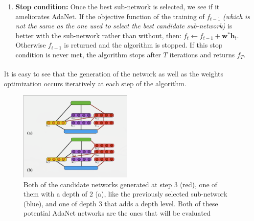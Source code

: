 \documentclass[11 pt]{article}
\begin{document}
\begin{enumerate}
	\item \textbf{Stop condition: }Once the best sub-network is selected, we see if it ameliorates AdaNet. If the objective function of the training of \(f_{t-1}\) \textit{(which is not the same as the one used to select the best candidate sub-network)} is better with the sub-network rather than without, then: \(f_t \leftarrow f_{t-1}+ \mathbf{w^*h}_t\). Otherwise \(f_{t-1}\) is returned and the algorithm is stopped. If this stop condition is never met, the algorithm stops after \(T\) iterations and returns \(f_T\).
\end{enumerate}

\paragraph{}It is easy to see that the generation of the network as well as the weights optimization occurs iteratively at each step of the algorithm.
\begin{figure}[h]
	\centering
	\includegraphics[width=0.5\textwidth]{schema.png}
	\caption{Both of the candidate networks generated at step \(3\) (red), one of them with a depth of \(2\) (a), like the previously selected sub-network (blue), and one of depth \(3\) that adds a depth level. Both of these potential AdaNet networks are the ones that will be evaluated}
	\label{candidateModels}
\end{figure}
\end{document}

